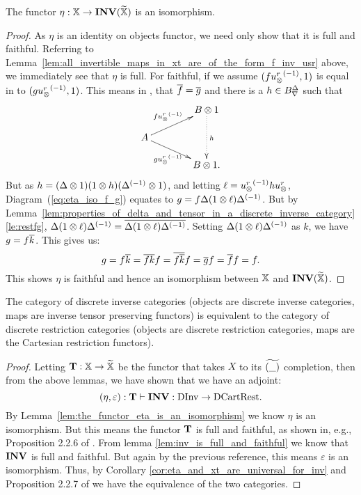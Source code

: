 \begin{lemma}\label{lem:the_functor_eta_is_an_isomorphism}
  The functor $\eta:\mathbb{X} \to \mathbf{INV}({\widetilde{\mathbb{X}}})$ is an isomorphism.
\end{lemma}
\begin{proof}
  As $\eta$ is an identity on objects functor, we need only show that it is full and faithful.
  Referring to Lemma~\ref{lem:all_invertible_maps_in_xt_are_of_the_form_f_inv_usr} above, we
  immediately see that $\eta$ is full. For faithful, if we assume $(f{u_{\otimes}^r}^{(-1)},1)$ is equal in \Xt
  to $(g{u_{\otimes}^r}^{(-1)},1)$. This means in \X, that $\overline{f} = \overline{g}$ and there is a $h\in{B}^{\Delta}_{\nabla}$ such that
  \begin{equation}
    \xymatrix @C=40pt @R=15pt{
      & B \* 1 \ar@{.>}[dd]^{h} \\
      A \ar[ur]^{f\inv{\usr}} \ar[dr]_{g\inv{\usr}}\\
      & B\* 1.
    }\label{eq:eta_iso_f_g}
  \end{equation}
  But as $h = (\Delta\otimes1)(1\otimes h)({\Delta}^{(-1)}\otimes1)$, and letting $\ell =  {u_{\otimes}^r}^{(-1)}hu_{\otimes}^r$,
  Diagram~(\ref{eq:eta_iso_f_g}) equates to $g = f \Delta (1\otimes\ell) {\Delta}^{(-1)}$. But by
  Lemma~\ref{lem:properties_of_delta_and_tensor_in_a_discrete_inverse_category}\ref{le:restfg},
  $\Delta (1\otimes \ell) {\Delta}^{(-1)} = \overline{\Delta (1\otimes \ell) {\Delta}^{(-1)}}$. Setting $\Delta (1\otimes \ell)
  {\Delta}^{(-1)}$ as $k$, we have $g = f \overline{k}$. This gives us:
  \[
    g = f \overline{k} = \overline{f k} f = \overline{f \overline{k}} f = \overline{g} f = \overline{f} f = f.
  \]
  This shows $\eta$ is faithful and hence an isomorphism between $\mathbb{X}$ and $\mathbf{INV}({\widetilde{\mathbb{X}}})$.
\end{proof}

\begin{theorem}\label{thm:discrete_inverse_categories_are_equivalent_to_discrete_restriction_categories}
  The category of discrete inverse categories (objects are discrete inverse categories, maps are
  inverse tensor preserving functors) is equivalent to the category of discrete restriction
  categories (objects are discrete restriction categories, maps are the Cartesian restriction
  functors).
\end{theorem}
\begin{proof}
  Letting $\mathbf{T}:\mathbb{X} \to \widetilde{\mathbb{X}}$ be the functor that takes $X$ to its $\widetilde{(\_)}$ completion, then from the
  above lemmas, we have shown that we have an adjoint:
  \begin{equation}
    (\eta,\varepsilon):\mathbf{T} \vdash \mathbf{INV} :\text{DInv} \to \text{DCartRest}. \label{eq:inv_and_wtf_are_adjoint_pair}
  \end{equation}
  By Lemma~\ref{lem:the_functor_eta_is_an_isomorphism} we know $\eta$ is an isomorphism. But this
  means the functor $\mathbf{T}$ is full and faithful, as shown in, e.g., Proposition 2.2.6 of
  \cite{cockett2009:ctcs}. From lemma \ref{lem:inv_is_full_and_faithful} we know that $\mathbf{INV}$ is
  full and faithful. But again by the previous reference, this means $\varepsilon$ is an
  isomorphism. Thus, by Corollary \ref{cor:eta_and_xt_are_universal_for_inv} and Proposition 2.2.7
  of \cite{cockett2009:ctcs} we have the equivalence of the two categories.
\end{proof}

